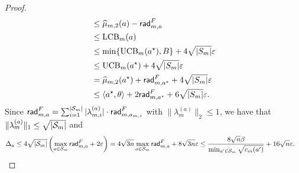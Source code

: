 \begin{proof}
\begin{align*}
        &\leq \widehat{\mu}_{m,2}(a) - \mathsf{rad}_{m,a}^{F} \\
        &\leq {\operatorname{LCB}}_m(a) \\
        &\leq \min\{{\operatorname{UCB}}_m(a^\star),B\}+4\sqrt{|S_m|}\varepsilon \\
        &\leq {\operatorname{UCB}}_m(a^\star) + 4\sqrt{|S_m|}\varepsilon \\
        &= \widehat{\mu}_{m,2}(a^\star) + \mathsf{rad}_{m,a^\star}^{F}+ 4\sqrt{|S_m|}\varepsilon \\
        &\leq \left\langle {a^\star,\theta} \right\rangle + 2\mathsf{rad}_{m,a^\star}^{F} + 6\sqrt{|S_m|}\varepsilon.
    \end{align*}
    Since $\mathsf{rad}_{m,a}^F = \sum_{i=1}^{|{\mathcal{S}}_m|}|\lambda_{m,i}^{(a)}|\cdot \mathsf{rad}_{m,a_{m,i}}^{F}$ with $\|\lambda_{m}^{(a)}\|_2\leq 1$, we have that $\|\lambda_{m}^{(a)}\|_1\leq \sqrt{|{\mathcal{S}}_m|}$ and
    \begin{align*}
        &\Delta_a\leq 4\sqrt{|{\mathcal{S}}_m|}\left(\max_{a\in {\mathcal{S}}_m}\mathsf{rad}_{m,a}^{F}+2\varepsilon\right)= 4\sqrt{3n}\max_{a\in {\mathcal{S}}_m}\mathsf{rad}_{m,a}^{F}+8\sqrt{3n}\varepsilon \leq \frac{8\sqrt{n}\beta}{\min_{a'\in {\mathcal{S}}_m}\sqrt{c_m(a')}}+16\sqrt{n}\varepsilon.
    \end{align*}
    

\end{proof}
